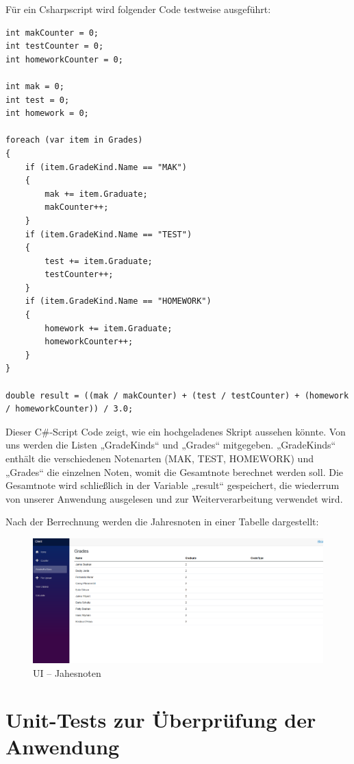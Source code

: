 Für ein Csharpscript wird folgender Code testweise ausgeführt:
    
\begin{lstlisting}[language={[Sharp]C},caption=Csharpscript,label=lst:impl:csctest]
int makCounter = 0;
int testCounter = 0;
int homeworkCounter = 0;

int mak = 0;
int test = 0;
int homework = 0;

foreach (var item in Grades)
{
    if (item.GradeKind.Name == "MAK")
    {
        mak += item.Graduate;
        makCounter++;
    }
    if (item.GradeKind.Name == "TEST")
    {
        test += item.Graduate;
        testCounter++;
    }
    if (item.GradeKind.Name == "HOMEWORK")
    {
        homework += item.Graduate;
        homeworkCounter++;
    }
}

double result = ((mak / makCounter) + (test / testCounter) + (homework / homeworkCounter)) / 3.0;
\end{lstlisting}

Dieser C\#-Script Code zeigt, wie ein hochgeladenes Skript aussehen könnte. Von uns werden die 
Listen „GradeKinds“ und „Grades“ mitgegeben. „GradeKinds“ enthält die verschiedenen Notenarten 
(MAK, TEST, HOMEWORK) und „Grades“ die einzelnen Noten, womit die Gesamtnote berechnet werden soll. 
Die Gesamtnote wird schließlich in der Variable „result“ gespeichert, die wiederrum von unserer 
Anwendung ausgelesen und zur Weiterverarbeitung verwendet wird.

\newpage

Nach der Berrechnung werden die Jahresnoten in einer Tabelle dargestellt:

\begin{figure}[H]
    \centering
    \includegraphics[scale=0.5]{pics/GradesForClass.png}
    \caption{UI -- Jahesnoten}
    \label{fig:impl:GradesForClass}
\end{figure}



\newpage
\section{Unit-Tests zur Überprüfung der Anwendung}

